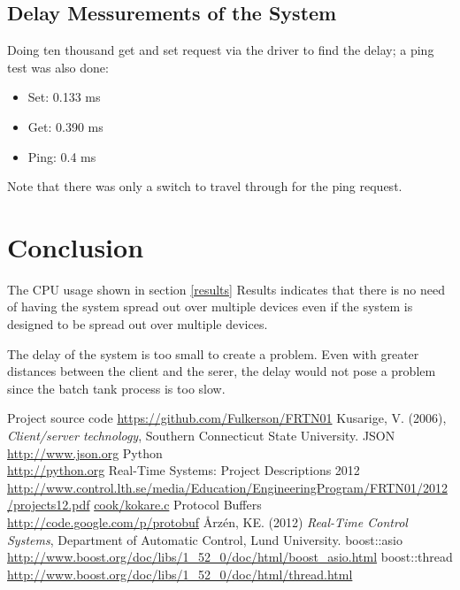 \documentclass{article}
\begin{document}
\subsection{Delay Messurements of the System}
Doing ten thousand get and set request via the driver to find the delay; a ping test was also done: 
\begin{itemize}
\item{Set: 0.133 ms}
\item{Get: 0.390 ms}
\item{Ping: 0.4 ms} 
\end{itemize}

Note that there was only a switch to travel through for the ping request.


\section{Conclusion}
The CPU usage shown in section \ref{results} Results indicates that there is no need of having
the system spread out over multiple devices even if the system is designed to be spread out over
multiple devices.

The delay of the system is too small to create a problem. Even with greater distances between the client and the serer, the delay would not pose a problem since the batch tank process is too slow.

\newpage

\begin{thebibliography}{9}
Project source code
\url{https://github.com/Fulkerson/FRTN01}
Kusarige, V. (2006), \emph{Client/server technology}, Southern Connecticut State University.
JSON\\
\url{http://www.json.org}
Python\\
\url{http://python.org}
Real-Time Systems: Project Descriptions 2012\\
\url{http://www.control.lth.se/media/Education/EngineeringProgram/FRTN01/2012/projects12.pdf}
\url{cook/kokare.c}
Protocol Buffers\\
\url{http://code.google.com/p/protobuf}
Årzén, KE. (2012) \emph{Real-Time Control Systems}, Department of
Automatic Control, Lund University.
boost::asio\\
\url{http://www.boost.org/doc/libs/1_52_0/doc/html/boost_asio.html}
boost::thread\\
\url{http://www.boost.org/doc/libs/1_52_0/doc/html/thread.html}
\end{thebibliography}
\end{document}

